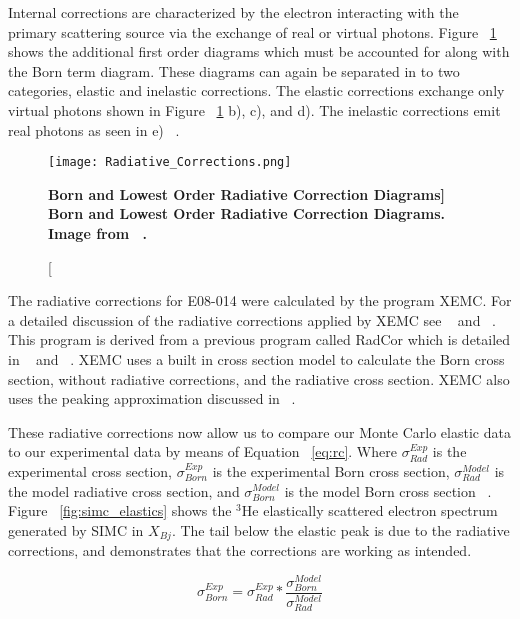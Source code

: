 Internal corrections are characterized by the electron interacting with the primary scattering source via the exchange of real or virtual photons. Figure ~\ref{fig:rc} shows the additional first order diagrams which must be accounted for along with the Born term diagram. These diagrams can again be separated in to two categories, elastic and inelastic corrections. The elastic corrections exchange only virtual photons shown in Figure ~\ref{fig:rc} b), c), and d). The inelastic corrections emit real photons as seen in e) ~\cite{Thesis:Wang}.

\begin{figure}[!ht]
\begin{center}
\texttt{[image: Radiative\_Corrections.png]}
\end{center}
\caption[\bf{Born and Lowest Order Radiative Correction Diagrams}]{
{\bf{Born and Lowest Order Radiative Correction Diagrams.}} Image from ~\cite{Thesis:Wang}.}
\label{fig:rc}
\end{figure}

The radiative corrections for E08-014 were calculated by the program XEMC. For a detailed discussion of the radiative corrections applied by XEMC see ~\cite{Article:RC} and ~\cite{Article:RC2}. This program is derived from a previous program called RadCor which is detailed in ~\cite{Thesis:Yao} and ~\cite{Thesis:Slifer}. XEMC uses a built in cross section model to calculate the Born cross section, without radiative corrections, and the radiative cross section. XEMC also uses the peaking approximation discussed in ~\cite{Article:RC2}. 

These radiative corrections now allow us to compare our Monte Carlo elastic data to our experimental data by means of Equation ~\ref{eq:rc}. Where $\sigma^{Exp}_{Rad}$ is the experimental cross section, $\sigma^{Exp}_{Born}$ is the experimental Born cross section, $\sigma^{Model}_{Rad}$ is the model radiative cross section, and $\sigma^{Model}_{Born}$ is the model Born cross section ~\cite{Thesis:Ye}. Figure ~\ref{fig:simc_elastics} shows the $^3$He elastically scattered electron spectrum generated by SIMC in $X_{Bj}$. The tail below the elastic peak is due to the radiative corrections, and demonstrates that the corrections are working as intended.

\begin{equation} \label{eq:rc}
	\sigma^{Exp}_{Born} = \sigma^{Exp}_{Rad} * \frac{\sigma^{Model}_{Born}}{\sigma^{Model}_{Rad}}
\end{equation}

